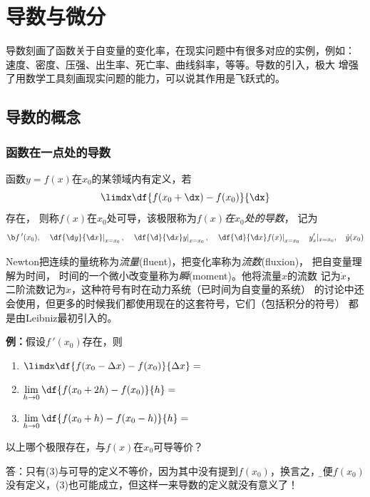 \setcounter{chapter}{1}

\chapter{导数与微分}

导数刻画了函数关于自变量的变化率，在现实问题中有很多对应的实例，例如：
速度、密度、压强、出生率、死亡率、曲线斜率，等等。导数的引入，极大
增强了用数学工具刻画现实问题的能力，可以说其作用是飞跃式的。

\section{导数的概念}

\subsection{函数在一点处的导数}

函数$y=f(x)$在$x_0$的某领域内有定义，若
$$\limdx\df{f(x_0+\dx)-f(x_0)}{\dx}$$
存在， 则称{$f(x)$在$x_0$处可导}，该极限称为{\it $f(x)$在$x_0$处的导数}， 记为
$${\b f\,'(x_0),\quad \left.\df{\d y}{\d x}\right|_{x=x_0},\quad\left.\df{\d
}{\d x}y\right|_{x=x_0},\quad \left.\df{\d }{\d x}f(x)\right|_{x=x_0}\quad
y'_x|_{x=x_0},\quad \dot{y}(x_0)}$$

\begin{shaded}
	Newton把连续的量统称为{\it 流量}(fluent)，把变化率称为{\it 流数}(fluxion)，
	把自变量理解为时间，	时间的一个微小改变量称为{\it 瞬}(moment)。他将流量$x$的流数
	记为$\dot{x}$，二阶流数记为$\ddot{x}$，这种符号有时在动力系统（已时间为自变量的系统）
	的讨论中还会使用，但更多的时候我们都使用现在的这套符号，它们（包括积分的符号）
	都是由Leibniz最初引入的。
\end{shaded}

{\bf 例：}假设$f\,'(x_0)$存在，则
\begin{enumerate}[(1)]
  \setlength{\itemindent}{1cm}
  \item $\limdx\df{f(x_0-\Delta x)-f(x_0)}{\Delta
  x}=$ \underline{\quad} 
  \item $\lim\limits_{h\to 0}\df{f(x_0+2h)-f(x_0)}{h}=$
   \underline{\quad} 
  \item $\lim\limits_{h\to 0}\df{f(x_0+h)-f(x_0-h)}{h}=$ 
  \underline{\quad}
\end{enumerate}
以上哪个极限存在，与$f(x)$在$x_0$可导等价？

答：只有(3)与可导的定义不等价，因为其中没有提到$f(x_0)$，换言之，{\b 即便$f(x_0)$
没有定义，(3)也可能成立，但这样一来导数的定义就没有意义了！}

